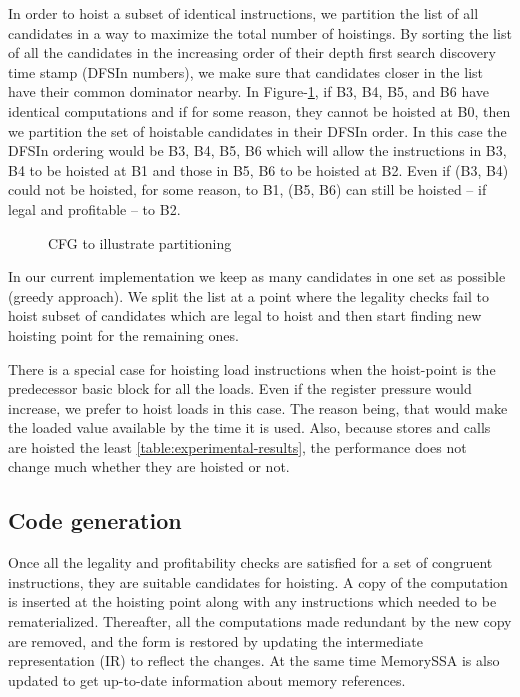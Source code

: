 \documentclass[acmlarge,review]{acmart}\settopmatter{printfolios=true}
\begin{document}
In order to hoist a subset of identical instructions, we partition the list of
all candidates in a way to maximize the total number of hoistings.  By sorting
the list of all the candidates in the increasing order of their depth first
search discovery time stamp \cite{clrs} (DFSIn numbers), we make sure that
candidates closer in the list have their common dominator nearby. In
Figure-\ref{fig:dfsin}, if B3, B4, B5, and B6 have identical computations and if
for some reason, they cannot be hoisted at B0, then we partition the set of
hoistable candidates in their DFSIn order. In this case the DFSIn ordering would
be B3, B4, B5, B6 which will allow the instructions in B3, B4 to be hoisted at
B1 and those in B5, B6 to be hoisted at B2. Even if (B3, B4) could not be
hoisted, for some reason, to B1, (B5, B6) can still be hoisted -- if legal and
profitable -- to B2.

\begin{figure}
\centering
\caption{CFG to illustrate partitioning}
\label{fig:dfsin}
\end{figure}

In our current implementation we keep as many candidates in one set as possible
(greedy approach). We split the list at a point where the legality checks fail
to hoist subset of candidates which are legal to hoist and then start finding
new hoisting point for the remaining ones.


There is a special case for hoisting load instructions when the hoist-point is
the predecessor basic block for all the loads. Even if the register pressure
would increase, we prefer to hoist loads in this case. The reason being, that
would make the loaded value available by the time it is used. Also, because
stores and calls are hoisted the least \ref{table:experimental-results}, the
performance does not change much whether they are hoisted or not.

\subsection{Code generation}
Once all the legality and profitability checks are satisfied for a set of
congruent instructions, they are suitable candidates for hoisting. A copy of the
computation is inserted at the hoisting point along with any instructions which
needed to be rematerialized. Thereafter, all the computations made redundant by
the new copy are removed, and the \SSA{} form is restored by updating the
intermediate representation (IR) to reflect the changes. At the same time
MemorySSA is also updated to get up-to-date information about memory references.
\end{document}
